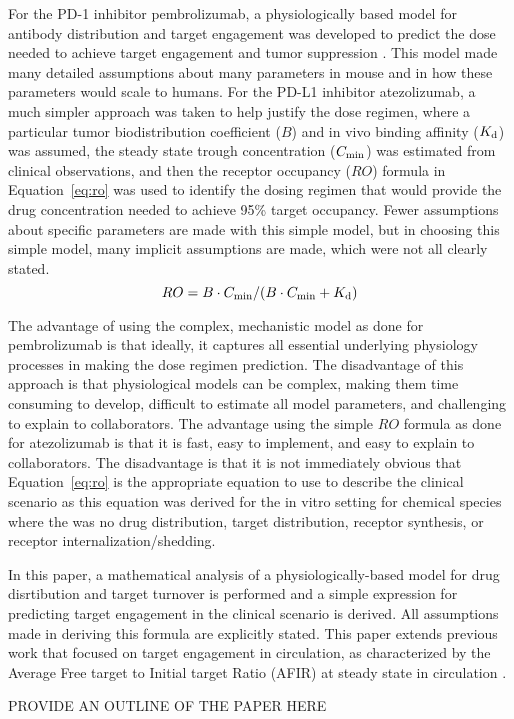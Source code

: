 For the PD-1 inhibitor pembrolizumab, a physiologically based model for antibody distribution and target engagement was developed to predict the dose needed to achieve target engagement and tumor suppression \cite{lindauer17}.  This model made many detailed assumptions about many parameters in mouse and in how these parameters would scale to humans.  For the PD-L1 inhibitor atezolizumab, a much simpler approach was taken to help justify the dose regimen, where a particular tumor biodistribution coefficient ($B$) and in vivo binding affinity ($K_\text{d}$) was assumed, the steady state trough concentration ($C_\text{min}$) was estimated from clinical observations, and then the receptor occupancy ($RO$) formula in Equation~\ref{eq:ro} was used to identify the dosing regimen that would provide the drug concentration needed to achieve 95\% target occupancy.  Fewer assumptions about specific parameters are made with this simple model, but in choosing this simple model, many implicit assumptions are made, which were not all clearly stated.
\begin{equation}
RO = B\cdot C_\text{min}/(B\cdot C_\text{min}+K_\text{d})
\label{eq:ro}
\end{equation}

The advantage of using the complex, mechanistic model as done for pembrolizumab is that ideally, it captures all essential underlying physiology processes in making the dose regimen prediction.  The disadvantage of this approach is that physiological models can be complex, making them time consuming to develop, difficult to estimate all model parameters, and challenging to explain to collaborators.  The advantage using the simple $RO$ formula as done for atezolizumab is that it is fast, easy to implement, and easy to explain to collaborators.  The disadvantage is that it is not immediately obvious that Equation~\ref{eq:ro} is the appropriate equation to use to describe the clinical scenario as this equation was derived for the in vitro setting for chemical species\cite{boeynaems80} where the was no drug distribution, target distribution, receptor synthesis, or receptor internalization/shedding.

In this paper, a mathematical analysis of a physiologically-based model for drug disrtibution and target turnover  is performed and a simple expression for predicting target engagement in the clinical scenario is derived.  All assumptions made in deriving this formula are explicitly stated.  This paper extends previous work that focused on target engagement in circulation, as characterized by the Average Free target to Initial target Ratio (AFIR) at steady state in circulation \cite{stein17}.

PROVIDE AN OUTLINE OF THE PAPER HERE